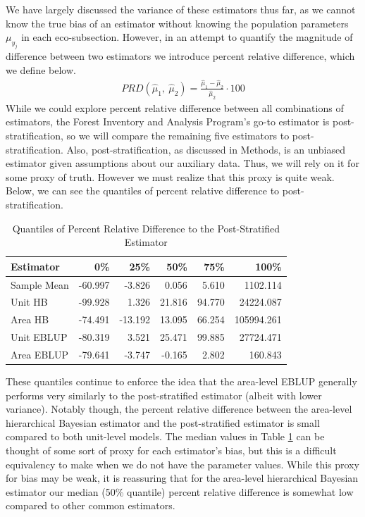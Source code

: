 \documentclass[12pt,twoside]{reedthesis}
\begin{document}
We have largely discussed the variance of these estimators thus far, as we cannot know the true bias of an estimator without knowing the population parameters \(\mu_{y_j}\) in each eco-subsection. However, in an attempt to quantify the magnitude of difference between two estimators we introduce percent relative difference, which we define below.
\begin{align*}
PRD(\hat\mu_1,~ \hat\mu_2) = \frac{\hat \mu_1 - \hat\mu_2}{\hat\mu_2} \cdot 100
\end{align*}
While we could explore percent relative difference between all combinations of estimators, the Forest Inventory and Analysis Program's go-to estimator is post-stratification, so we will compare the remaining five estimators to post-stratification. Also, post-stratification, as discussed in Methods, is an unbiased estimator given assumptions about our auxiliary data. Thus, we will rely on it for some proxy of truth. However we must realize that this proxy is quite weak. Below, we can see the quantiles of percent relative difference to post-stratification.
\begin{longtable}[t]{lrrrrr}
\caption{\label{tab:prd-tab}Quantiles of Percent Relative Difference to the Post-Stratified Estimator}\\
\toprule
Estimator & 0\% & 25\% & 50\% & 75\% & 100\%\\
\midrule
Sample Mean & -60.997 & -3.826 & 0.056 & 5.610 & 1102.114\\
Unit HB & -99.928 & 1.326 & 21.816 & 94.770 & 24224.087\\
Area HB & -74.491 & -13.192 & 13.095 & 66.254 & 105994.261\\
Unit EBLUP & -80.319 & 3.521 & 25.471 & 99.885 & 27724.471\\
Area EBLUP & -79.641 & -3.747 & -0.165 & 2.802 & 160.843\\
\bottomrule
\end{longtable}
These quantiles continue to enforce the idea that the area-level EBLUP generally performs very similarly to the post-stratified estimator (albeit with lower variance). Notably though, the percent relative difference between the area-level hierarchical Bayesian estimator and the post-stratified estimator is small compared to both unit-level models. The median values in Table \ref{tab:prd-tab} can be thought of some sort of proxy for each estimator's bias, but this is a difficult equivalency to make when we do not have the parameter values. While this proxy for bias may be weak, it is reassuring that for the area-level hierarchical Bayesian estimator our median (50\% quantile) percent relative difference is somewhat low compared to other common estimators.
\end{document}

